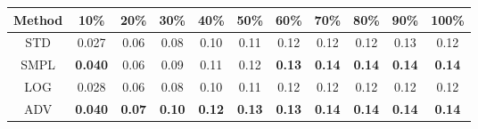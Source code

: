 \documentclass{standalone}
\begin{document}
\begin{tabular}{c|cccccccccc}
      \toprule
      Method & 10\% & 20\% & 30\% & 40\% & 50\% & 60\% & 70\% & 80\% & 90\% & 100\% \\
      \midrule
STD & 0.027 & 0.06 & 0.08 & 0.10 & 0.11 & 0.12 & 0.12 & 0.12 & 0.13 & 0.12\\
SMPL & \textbf{0.040} & 0.06 & 0.09 & 0.11 & 0.12 & \textbf{0.13} & \textbf{0.14} & \textbf{0.14} & \textbf{0.14} & \textbf{0.14}\\
LOG & 0.028 & 0.06 & 0.08 & 0.10 & 0.11 & 0.12 & 0.12 & 0.12 & 0.12 & 0.12\\
ADV & \textbf{0.040} & \textbf{0.07} & \textbf{0.10} & \textbf{0.12} & \textbf{0.13} & \textbf{0.13} & \textbf{0.14} & \textbf{0.14} & \textbf{0.14} & \textbf{0.14}\\
  \bottomrule
\end{tabular}
\end{document}
